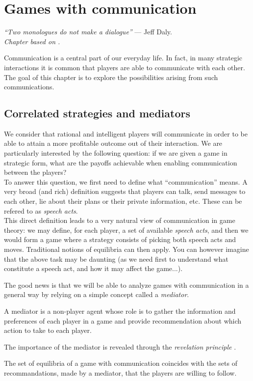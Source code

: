 \ifx \globalmark \undefined %
	
\else
\fi


\chapter{Games with communication}
{\large{\itshape
``Two monologues do not make a dialogue''} --- Jeff Daly.\\
}
\label{chap:Cor}
  {\small{\itshape
Chapter based on \cite[pages 244 to 263]{MyGTAO}.}\\
}

Communication is a central part of our everyday life. In fact, in many strategic interactions it is common that players are able to communicate with each other.
The goal of this chapter is to explore the possibilities arising from such communications.

\section{Correlated strategies and mediators}


We consider that rational and intelligent players will communicate in order to be able to attain a more profitable outcome out of their interaction.
We are particularly interested by the following question: if we are given a game in strategic form, what are the payoffs achievable when enabling communication between the players?\\
To answer this question, we first need to define what ``communication'' means. A very broad (and rich) definition suggests that players can talk, send messages to each other, lie about their plans or their private information, etc. These can be refered to as \emph{speech acts}.\\
This direct definition leads to a very natural view of communication in game theory: we may define, for each player, a set of available \emph{speech acts}, and then we would form a game where a strategy consists of picking both speech acts and moves. Traditional notions of equilibria can then apply. You can however imagine that the above task may be daunting (as we need first to understand what constitute a speech act, and how it may affect the game...).

The good news is that we will be able to analyze games with communication in a general way by relying on a simple concept called a \emph{mediator}.
\begin{definition}
A mediator is a non-player agent whose role is to gather the information and preferences of each player in a game and provide recommendation about which action to take to each player.
\end{definition}
The importance of the mediator is revealed through the \emph{revelation principle} \cite[page 257]{MyGTAO}.
\begin{definition}
The set of equilibria of a game with communication coincides with the sets of recommandations, made by a mediator, that the players are willing to follow.
\end{definition}

